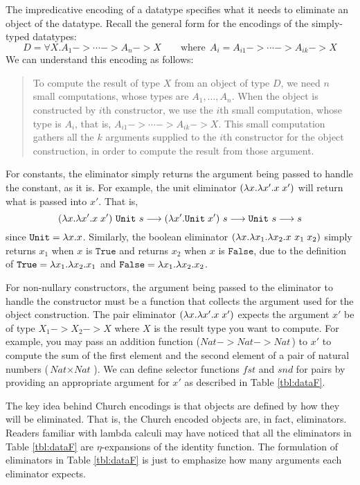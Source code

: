 The impredicative encoding of a datatype specifies what it needs to eliminate
an object of the datatype. Recall the general form for the encodings of
the simply-typed datatypes:
\[D = \forall X. A_1 -> \cdots -> A_n -> X
	\qquad\text{where}~~ A_i = A_{i1} -> \cdots -> A_{ik} -> X \]
We can understand this encoding as follows:
\begin{quote}
To compute the result of type $X$ from an object of type $D$,
we need $n$ small computations, whose types are $A_1,\dots,A_n$.
When the object is constructed by $i$th constructor, we use the $i$th small
computation, whose type is $A_i$, that is, $A_{i1} -> \cdots -> A_{ik} -> X$.
This small computation gathers all the $k$ arguments supplied to
the $i$th constructor for the object construction, in order to
compute the result from those argument.
\end{quote}

For constants, the eliminator simply returns the argument being passed
to handle the constant, as it is. For example, the unit eliminator
$(\lambda x .\lambda x'.x\;x')$ will return what is passed into $x'$. That is,
\[   (\lambda x .\lambda x'.x\;x')~\mathtt{Unit}~s
 --> (\lambda x'.\mathtt{Unit}\;x')~s
 --> \mathtt{Unit}~s
 --> s
\] since $\texttt{Unit}=\lambda x.x$.
Similarly, the boolean eliminator $(\lambda x.\lambda x_1.\lambda x_2.x~x_1\;x_2)$
simply returns $x_1$ when $x$ is $\mathtt{True}$
and returns $x_2$ when $x$ is $\mathtt{False}$,
due to the definition of $\mathtt{True} = \lambda x_1.\lambda x_2. x_1$
and $\mathtt{False} = \lambda x_1.\lambda x_2. x_2$.

For non-nullary constructors, the argument being passed to the eliminator
to handle the constructor must be a function that collects the argument used
for the object construction. The pair eliminator $(\lambda x.\lambda x'.x\;x')$ expects
the argument $x'$ be of type $X_1 -> X_2 -> X$ where $X$ is the result type
you want to compute. For example, you may pass an addition function 
($\textit{Nat} -> \textit{Nat} -> \textit{Nat}\,$) to $x'$ to compute
the sum of the first element and the second element of a pair of
natural numbers ($\textit{Nat}\times\textit{Nat}\,$). We can define
selector functions $\mathit{fst}$ and $\mathit{snd}$ for pairs by
providing an appropriate
argument for $x'$ as described in Table \ref{tbl:dataF}.

The key idea behind Church encodings is that objects are defined by
how they will be eliminated. That is, the Church encoded objects
are, in fact, eliminators. Readers familiar with lambda calculi may have
noticed that all the eliminators in Table \ref{tbl:dataF} are
$\eta$-expansions of the identity function. The formulation of eliminators
in Table \ref{tbl:dataF} is just to emphasize how many arguments
each eliminator expects.

